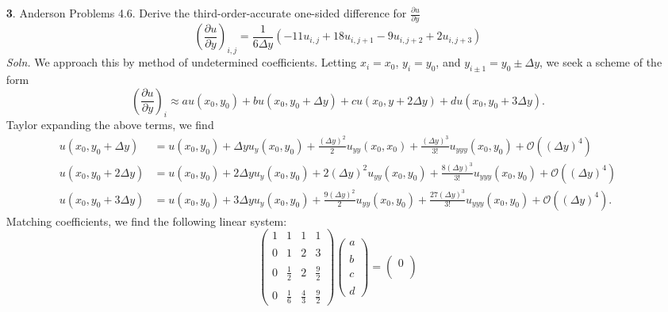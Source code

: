 \documentclass{article}
\begin{document}
\begin{itemize}
    \pagebreak


    \item[\textbf{3}.] Anderson Problems 4.6. Derive the third-order-accurate one-sided difference for $\frac{\partial u}{\partial y}$
    \[\left(\frac{\partial u}{\partial y}\right)_{i,j} = \frac{1}{6\Delta y}(-11u_{i,j} + 18u_{i,j+1} - 9u_{i,j+2} + 2u_{i,j+3})\]
    \textit{Soln.} We approach this by method of undetermined coefficients. Letting $x_i = x_0$, $y_i = y_0$, and $y_{i\pm 1} = y_0 \pm \Delta y$, we seek a scheme of the form
    \[\left(\frac{\partial u}{\partial y}\right)_i \approx au(x_0,y_0) + bu(x_0, y_0 + \Delta y) + cu(x_0, y + 2\Delta y) + du(x_0, y_0 + 3\Delta y).\]
    Taylor expanding the above terms, we find
    \begin{align*}
        u(x_0,y_0 + \Delta y) &= u(x_0, y_0) + \Delta y u_y(x_0, y_0) + \frac{(\Delta y)^2}{2}u_{yy}(x_0,x_0) + \frac{(\Delta y)^3}{3!}u_{yyy}(x_0,y_0) + \mathcal{O}((\Delta y)^4)\\
        u(x_0, y_0 + 2\Delta y) &= u(x_0, y_0) + 2\Delta y u_y(x_0, y_0) + 2(\Delta y)^2u_{yy}(x_0, y_0) + \frac{8(\Delta y)^3}{3!}u_{yyy}(x_0,y_0) + \mathcal{O}((\Delta y)^4)\\
        u(x_0, y_0 + 3\Delta y) &= u(x_0, y_0) + 3\Delta y u_y(x_0, y_0) + \frac{9(\Delta y)^2}{2}u_{yy}(x_0, y_0) + \frac{27(\Delta y)^3}{3!}u_{yyy}(x_0,y_0) + \mathcal{O}((\Delta y)^4).
    \end{align*}
    Matching coefficients, we find the following linear system:
    \[\begin{pmatrix}
        1 & 1 & 1 & 1\\\\
        0 & 1 & 2 & 3\\\\
        0 & \tfrac{1}{2} & 2 & \tfrac{9}{2}\\\\
        0 & \tfrac{1}{6} & \tfrac{4}{3} & \tfrac{9}{2}
    \end{pmatrix}
    \begin{pmatrix}
        a\\\\
        b\\\\
        c\\\\
        d
    \end{pmatrix} = \begin{pmatrix}
        0\\\\

\end{pmatrix}\]
\end{itemize}
\end{document}
